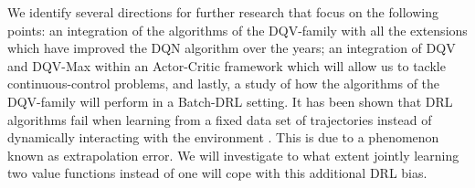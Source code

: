 We identify several directions for further research that focus on the following points: an integration of the algorithms of the DQV-family with all the extensions which have improved the DQN algorithm over the years; an integration of DQV and DQV-Max within an Actor-Critic framework which will allow us to tackle continuous-control problems, and lastly, a study of how the algorithms of the DQV-family will perform in a Batch-DRL setting. It has been shown that DRL algorithms fail when learning from a fixed data set of trajectories instead of dynamically interacting with the environment \cite{fujimoto2019benchmarking}. This is due to a phenomenon known as extrapolation error. We will investigate to what extent jointly learning two value functions instead of one will cope with this additional DRL bias.

